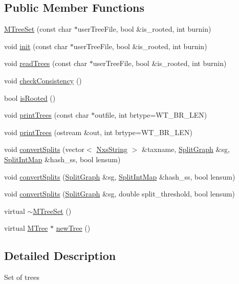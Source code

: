\subsection*{Public Member Functions}
\begin{DoxyCompactItemize}
\item 
\hyperlink{classMTreeSet_a88d94d529da4f81c2fe4537baa794333}{MTreeSet} (const char $\ast$userTreeFile, bool \&is\_\-rooted, int burnin)
\item 
void \hyperlink{classMTreeSet_aef18c58d44d7f2fe2a9cf81e68e570cd}{init} (const char $\ast$userTreeFile, bool \&is\_\-rooted, int burnin)
\item 
void \hyperlink{classMTreeSet_a5522394de84eee1544e021d1baed3655}{readTrees} (const char $\ast$userTreeFile, bool \&is\_\-rooted, int burnin)
\item 
void \hyperlink{classMTreeSet_a0ebff75dc397363dc55622ad094c4432}{checkConsistency} ()
\item 
bool \hyperlink{classMTreeSet_a1788a15758d1c5292f05afb3b7920fbe}{isRooted} ()
\item 
void \hyperlink{classMTreeSet_a0fbde69391914ed669cd05007946867d}{printTrees} (const char $\ast$outfile, int brtype=WT\_\-BR\_\-LEN)
\item 
void \hyperlink{classMTreeSet_ad4401d1bde1649b95439953c218ca224}{printTrees} (ostream \&out, int brtype=WT\_\-BR\_\-LEN)
\item 
void \hyperlink{classMTreeSet_ae937b8a9957d096c14b2fa9364c6c660}{convertSplits} (vector$<$ \hyperlink{classNxsString}{NxsString} $>$ \&taxname, \hyperlink{classSplitGraph}{SplitGraph} \&sg, \hyperlink{classSplitIntMap}{SplitIntMap} \&hash\_\-ss, bool lensum)
\item 
void \hyperlink{classMTreeSet_ae973cf95e914256097ee21fd2491b89a}{convertSplits} (\hyperlink{classSplitGraph}{SplitGraph} \&sg, \hyperlink{classSplitIntMap}{SplitIntMap} \&hash\_\-ss, bool lensum)
\item 
void \hyperlink{classMTreeSet_a935eb55c363c816242dfa2c1f112cbec}{convertSplits} (\hyperlink{classSplitGraph}{SplitGraph} \&sg, double split\_\-threshold, bool lensum)
\item 
virtual \hyperlink{classMTreeSet_a27a34c268f7cdd554271771363d4d104}{$\sim$MTreeSet} ()
\item 
virtual \hyperlink{classMTree}{MTree} $\ast$ \hyperlink{classMTreeSet_a14f065ce54450ea54f3fd8e1cc025103}{newTree} ()
\end{DoxyCompactItemize}


\subsection{Detailed Description}
Set of trees


